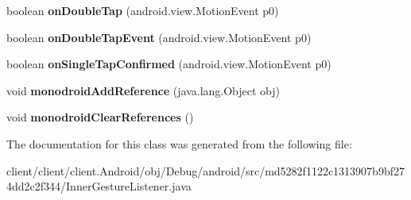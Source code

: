 \begin{DoxyCompactItemize}
\item 
\hypertarget{classmd5282f1122c1313907b9bf274dd2c2f344_1_1InnerGestureListener_ab5c770014e9d3fd25e3104692056d86c}{}boolean {\bfseries on\+Double\+Tap} (android.\+view.\+Motion\+Event p0)\label{classmd5282f1122c1313907b9bf274dd2c2f344_1_1InnerGestureListener_ab5c770014e9d3fd25e3104692056d86c}

\item 
\hypertarget{classmd5282f1122c1313907b9bf274dd2c2f344_1_1InnerGestureListener_aa16ec75ed59e65dba2ae456338699ce6}{}boolean {\bfseries on\+Double\+Tap\+Event} (android.\+view.\+Motion\+Event p0)\label{classmd5282f1122c1313907b9bf274dd2c2f344_1_1InnerGestureListener_aa16ec75ed59e65dba2ae456338699ce6}

\item 
\hypertarget{classmd5282f1122c1313907b9bf274dd2c2f344_1_1InnerGestureListener_ac53f9ebaac10b9edf3a9e73869be6a4a}{}boolean {\bfseries on\+Single\+Tap\+Confirmed} (android.\+view.\+Motion\+Event p0)\label{classmd5282f1122c1313907b9bf274dd2c2f344_1_1InnerGestureListener_ac53f9ebaac10b9edf3a9e73869be6a4a}

\item 
\hypertarget{classmd5282f1122c1313907b9bf274dd2c2f344_1_1InnerGestureListener_a1ecf315abd74331cf47c199c049b3a2c}{}void {\bfseries monodroid\+Add\+Reference} (java.\+lang.\+Object obj)\label{classmd5282f1122c1313907b9bf274dd2c2f344_1_1InnerGestureListener_a1ecf315abd74331cf47c199c049b3a2c}

\item 
\hypertarget{classmd5282f1122c1313907b9bf274dd2c2f344_1_1InnerGestureListener_ae5bd3721ce073951e41179b6d23bce09}{}void {\bfseries monodroid\+Clear\+References} ()\label{classmd5282f1122c1313907b9bf274dd2c2f344_1_1InnerGestureListener_ae5bd3721ce073951e41179b6d23bce09}

\end{DoxyCompactItemize}


The documentation for this class was generated from the following file\+:\begin{DoxyCompactItemize}
\item 
client/client/client.\+Android/obj/\+Debug/android/src/md5282f1122c1313907b9bf274dd2c2f344/Inner\+Gesture\+Listener.\+java\end{DoxyCompactItemize}

